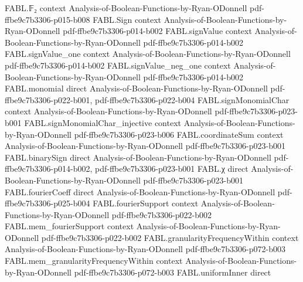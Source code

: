 \begin{theorem}
\leanok
{}
\proofstep
  {FABL.𝔽₂}
  {context}
  {Analysis-of-Boolean-Functions-by-Ryan-ODonnell}
  {pdf-ffbe9c7b3306-p015-b008}
\proofstep
  {FABL.Sign}
  {context}
  {Analysis-of-Boolean-Functions-by-Ryan-ODonnell}
  {pdf-ffbe9c7b3306-p014-b002}
\proofstep
  {FABL.signValue}
  {context}
  {Analysis-of-Boolean-Functions-by-Ryan-ODonnell}
  {pdf-ffbe9c7b3306-p014-b002}
\proofstep
  {FABL.signValue_one}
  {context}
  {Analysis-of-Boolean-Functions-by-Ryan-ODonnell}
  {pdf-ffbe9c7b3306-p014-b002}
\proofstep
  {FABL.signValue_neg_one}
  {context}
  {Analysis-of-Boolean-Functions-by-Ryan-ODonnell}
  {pdf-ffbe9c7b3306-p014-b002}
\proofstep
  {FABL.monomial}
  {direct}
  {Analysis-of-Boolean-Functions-by-Ryan-ODonnell}
  {pdf-ffbe9c7b3306-p022-b001,
    pdf-ffbe9c7b3306-p022-b004}
\proofstep
  {FABL.signMonomialChar}
  {context}
  {Analysis-of-Boolean-Functions-by-Ryan-ODonnell}
  {pdf-ffbe9c7b3306-p023-b001}
\proofstep
  {FABL.signMonomialChar_injective}
  {context}
  {Analysis-of-Boolean-Functions-by-Ryan-ODonnell}
  {pdf-ffbe9c7b3306-p023-b006}
\proofstep
  {FABL.coordinateSum}
  {context}
  {Analysis-of-Boolean-Functions-by-Ryan-ODonnell}
  {pdf-ffbe9c7b3306-p023-b001}
\proofstep
  {FABL.binarySign}
  {direct}
  {Analysis-of-Boolean-Functions-by-Ryan-ODonnell}
  {pdf-ffbe9c7b3306-p014-b002,
    pdf-ffbe9c7b3306-p023-b001}
\proofstep
  {FABL.χ}
  {direct}
  {Analysis-of-Boolean-Functions-by-Ryan-ODonnell}
  {pdf-ffbe9c7b3306-p023-b001}
\proofstep
  {FABL.fourierCoeff}
  {direct}
  {Analysis-of-Boolean-Functions-by-Ryan-ODonnell}
  {pdf-ffbe9c7b3306-p025-b004}
\proofstep
  {FABL.fourierSupport}
  {context}
  {Analysis-of-Boolean-Functions-by-Ryan-ODonnell}
  {pdf-ffbe9c7b3306-p022-b002}
\proofstep
  {FABL.mem_fourierSupport}
  {context}
  {Analysis-of-Boolean-Functions-by-Ryan-ODonnell}
  {pdf-ffbe9c7b3306-p022-b002}
\proofstep
  {FABL.granularityFrequencyWithin}
  {context}
  {Analysis-of-Boolean-Functions-by-Ryan-ODonnell}
  {pdf-ffbe9c7b3306-p072-b003}
\proofstep
  {FABL.mem_granularityFrequencyWithin}
  {context}
  {Analysis-of-Boolean-Functions-by-Ryan-ODonnell}
  {pdf-ffbe9c7b3306-p072-b003}
\proofstep
  {FABL.uniformInner}
  {direct}

\end{theorem}
